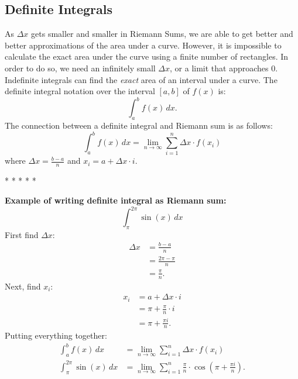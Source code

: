 \documentclass[12pt]{article}
\begin{document}
        \subsection{Definite Integrals} %
            As $\Delta x$ gets smaller and smaller in Riemann Sums, we are able to get better and better approximations of the area under a curve. However, it is impossible to calculate the exact area under the curve using a finite number of rectangles. In order to do so, we need an infinitely small $\Delta x$, or a limit that approaches $0$.
            \\ Indefinite integrals can find the \textit{exact} area of an interval under a curve.
            \newline \newline
            The definite integral notation over the interval $[a, b]$ of $f(x)$ is:
            \[ \int_{a}^{b} f(x) \, dx. \]
            The connection between a definite integral and Riemann sum is as follows:
            \[ \int_{a}^{b} f(x) \, dx = \lim_{n \to \infty} \sum_{i=1}^{n} \Delta x \cdot f(x_i) \]
            where $\Delta x = \frac{b-a}{n}$ and $x_i = a + \Delta x \cdot i$.
            \begin{center}
                * * * * *
            \end{center}
            \textbf{Example of writing definite integral as Riemann sum:}
            \[ \int_{\pi}^{2 \pi} \sin(x) \, dx \]
            First find $\Delta x$:
            \begin{align*}
                \Delta x &= \frac{b-a}{n} \\[6pt]
                &= \frac{2 \pi - \pi}{n} \\[6pt]
                &= \frac{\pi}{n}.
            \end{align*}
            Next, find $x_i$:
            \begin{align*}
                x_i &= a + \Delta x \cdot i \\
                &= \pi + \frac{\pi}{n} \cdot i \\[6pt]
                &= \pi + \frac{\pi i}{n}.
            \end{align*}
            Putting everything together:
            \begin{align*}
                \int_{a}^{b} f(x) \, dx &= \lim_{n \to \infty} \sum_{i=1}^{n} \Delta x \cdot f(x_i) \\[6pt]
                \int_{\pi}^{2 \pi} \sin(x) \, dx &= \lim_{n \to \infty} \sum_{i=1}^{n} \frac{\pi}{n} \cdot \cos{\left( \pi + \frac{\pi i}{n} \right)}.
            \end{align*}
\end{document}
